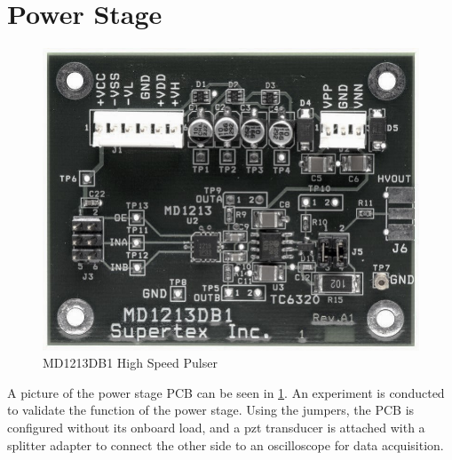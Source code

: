 \section{Power Stage}
\begin{figure}[htbp]
	\centering
	\includegraphics[width=.8\textwidth]{Figures/4_transmitter_pcb_pic.jpg}
	\caption{MD1213DB1 High Speed Pulser}
	\label{fig:4_transmitter_pcb_pic}
\end{figure}
A picture of the power stage PCB can be seen in \cref{fig:4_transmitter_pcb_pic}. An experiment is conducted to validate the function of the power stage. Using the jumpers, the PCB is configured without its onboard load, and a \gls{pzt} transducer is attached with a splitter adapter to connect the other side to an oscilloscope for data acquisition.

